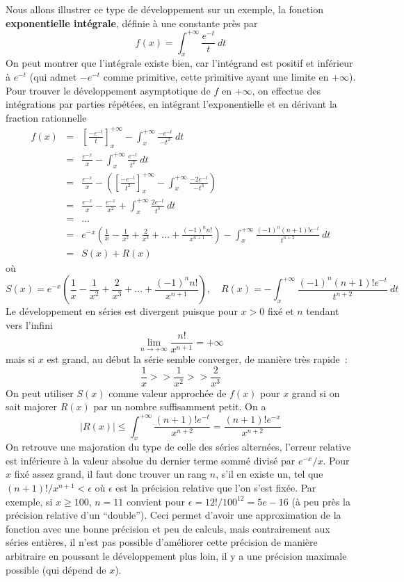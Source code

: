 \documentclass[a4paper,11pt]{book}
\begin{document}
\begin{giacjshere}
Nous allons illustrer ce type de développement sur un exemple, la fonction 
{\bf exponentielle intégrale}, 
définie à une constante près par
\[ f(x)=\int_x^{+\infty} \frac{e^{-t}}{t} \ dt \]
On peut montrer que l'intégrale existe bien, car l'intégrand est positif et inférieur à $e^{-t}$
(qui admet $-e^{-t}$ comme primitive, cette primitive ayant une limite en $+\infty$).
Pour trouver le développement asymptotique de $f$ en $+\infty$, on effectue des intégrations
par parties répétées, en intégrant l'exponentielle et en dérivant la fraction rationnelle
\begin{eqnarray*}
 f(x)&=&[\frac{-e^{-t}}{t}]_x^{+\infty} - \int_x^{+\infty} \frac{-e^{-t}}{-t^2} \ dt \\
&=& \frac{e^{-x}}{x} - \int_x^{+\infty} \frac{e^{-t}}{t^2} \ dt \\
&=& \frac{e^{-x}}{x} - ([\frac{-e^{-t}}{t^2}]_x^{+\infty} - \int_x^{+\infty} \frac{-2e^{-t}}{-t^3}) \\
&=& \frac{e^{-x}}{x} - \frac{e^{-x}}{x^2} + \int_x^{+\infty} \frac{2e^{-t}}{t^3} \ dt \\
&=& ... \\
&=& e^{-x}\left(\frac{1}{x} - \frac{1}{x^2} + \frac{2}{x^3} + ... + \frac{(-1)^n n!}{x^{n+1}}\right)
- \int_x^{+\infty} \frac{(-1)^n (n+1)!e^{-t}}{t^{n+2}} \ dt \\
&=& S(x) + R(x)
\end{eqnarray*}
où
\begin{equation} \label{eq:Eiinf}
 S(x)=e^{-x}
\left(\frac{1}{x} - \frac{1}{x^2} + \frac{2}{x^3} + ... + \frac{(-1)^n n!}{x^{n+1}}\right), 
\quad R(x)=- \int_x^{+\infty} \frac{(-1)^n (n+1)!e^{-t}}{t^{n+2}} \ dt 
\end{equation}
Le développement en séries est divergent puisque pour $x>0$ fixé et $n$ tendant vers l'infini
\[ \lim_{n\rightarrow +\infty} \frac{n!}{x^{n+1}} = +\infty\]
mais si $x$ est grand, au début la série semble converger, de manière très rapide~:
\[ \frac{1}{x} >> \frac{1}{x^2} >> \frac{2}{x^3} \]
On peut utiliser $S(x)$ comme valeur approchée de $f(x)$ pour $x$ grand si on sait majorer
$R(x)$ par un nombre suffisamment petit. On a
\[ | R(x) | \leq \int_x^{+\infty} \frac{(n+1)!e^{-t}}{x^{n+2}}
= \frac{(n+1)!e^{-x}}{x^{n+2}} \]
On retrouve une majoration du type de celle des séries alternées, 
l'erreur relative est inférieure
à la valeur absolue du dernier terme sommé divis\'e par $e^{-x}/x$. 
Pour $x$ fixé assez grand, il 
faut donc trouver un rang $n$, s'il en existe un, 
tel que $(n+1)!/x^{n+1}<\epsilon$ où
$\epsilon$ est la précision relative que l'on s'est fixée.
Par exemple, si $x\geq 100$, $n=11$ convient pour 
$\epsilon=12!/100^{12}=5e-16$ (à peu près
la précision relative d'un ``double'').
Ceci permet d'avoir une approximation de la fonction avec une bonne
pr\'ecision et peu de calculs, mais contrairement aux s\'eries enti\`eres,
il n'est pas possible d'am\'eliorer cette pr\'ecision de mani\`ere
arbitraire en poussant le d\'eveloppement plus loin, il y a une
pr\'ecision maximale possible (qui d\'epend de $x$).


\end{giacjshere}
\end{document}
